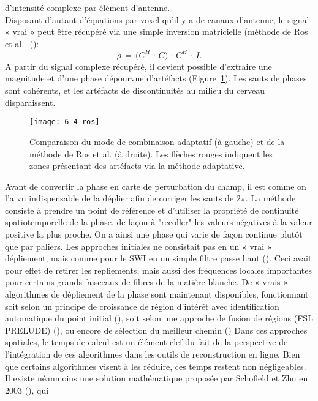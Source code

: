 {d’intensité complexe par élément d’antenne.\\
Disposant d’autant d’équations par voxel qu’il y a de canaux d’antenne, le signal « vrai » peut être
récupéré via une simple inversion matricielle (méthode de Ros et al. -(\cite{Ros2009}):
\begin{equation}
\rho\,=\,\bigl(C^H\,\cdot\, C\bigr)\,\cdot\,C^H\,\cdot\,I.
\end{equation}
A partir du signal complexe récupéré, il devient possible d’extraire une magnitude et d’une phase
dépourvue d’artéfacts (Figure~\ref{fig:6_4_ros}). Les sauts de phases sont cohérents, et les artéfacts de discontinuités
au milieu du cerveau disparaissent.\\
\begin{figure}[!t]
\centering
\texttt{[image: 6\_4\_ros]}
\caption{Comparaison du mode de combinaison adaptatif (à
gauche) et de la méthode de Ros et al. (à droite). Les flèches
rouges indiquent les zones présentant des artéfacts via la
méthode adaptative.}
\label{fig:6_4_ros}	
\end{figure}
Avant de convertir la phase en carte de perturbation du champ, il est comme on l’a vu
indispensable de la déplier afin de corriger les sauts de $2\pi$. La méthode consiste à prendre un point
de référence et d’utiliser la propriété de continuité spatiotemporelle de la phase, de façon à "recoller"
les valeurs négatives à la valeur positive la plus proche. On a ainsi une phase qui varie de façon continue
plutôt que par paliers. Les approches initiales ne consistait pas en un « vrai » dépliement, mais comme
pour le SWI en un simple filtre passe haut (\cite{Reichenbach2001}). Ceci avait pour effet de retirer les repliements, mais
aussi des fréquences locales importantes pour certains grands faisceaux de fibres de la matière
blanche. De « vrais » algorithmes de dépliement de la phase sont maintenant disponibles, fonctionnant
soit selon un principe de croissance de région d’intérêt avec identification automatique du point initial
(\cite{Witoszynskyj2009}), soit selon une approche de fusion de régions (FSL PRELUDE) (\cite{Jenkinson2003}), ou encore de sélection du
meilleur chemin (\cite{Abdul-Rahman2007}) Dans ces approches spatiales, le temps de calcul est un élément clef du fait de
la perspective de l’intégration de ces algorithmes dans les outils de reconstruction en ligne. Bien que
certains algorithmes visent à les réduire, ces temps restent non négligeables.\\
Il existe néanmoins une solution mathématique proposée par Schofield et Zhu en 2003 (\cite{Schofield2003}), qui
}
